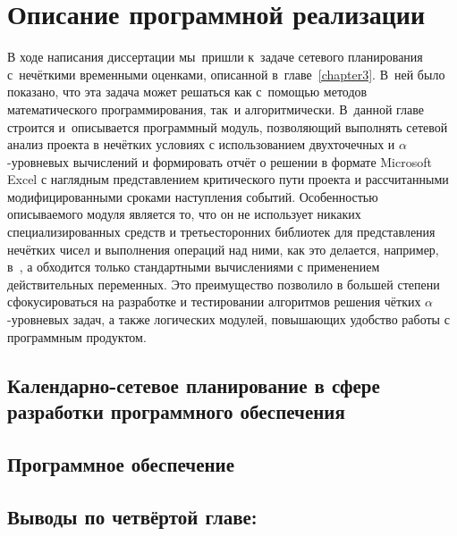 \chapter{Описание программной реализации}
\label{chapter4}

В ходе написания диссертации мы~пришли к~задаче сетевого планирования с~нечёткими временными оценками, описанной в~главе~\ref{chapter3}. В~ней было показано, что эта задача может решаться как с~помощью методов математического программирования, так~и алгоритмически. В~данной главе строится и~описывается программный модуль, позволяющий выполнять сетевой анализ проекта в нечётких условиях с использованием двухточечных и $\alpha$-уровневых вычислений и формировать отчёт о решении в формате Microsoft Excel с наглядным представлением критического пути проекта и рассчитанными модифицированными сроками наступления событий. Особенностью описываемого модуля является то, что он не использует никаких специализированных средств и третьесторонних библиотек для представления нечётких чисел и выполнения операций над ними, как это делается, например, в~\cite{Gallyamov, Kruglov_Balashov, Koroteev_Fuzzy_Arithmetics}, а обходится только стандартными вычислениями с применением действительных переменных. Это преимущество позволило в большей степени сфокусироваться на разработке и тестировании алгоритмов решения чётких $\alpha$-уровневых задач, а также логических модулей, повышающих удобство работы с программным продуктом.

\newpage
\section{Календарно-сетевое планирование в сфере разработки программного обеспечения} 
\label{chapter4_1}


\section{Программное обеспечение} 
\label{chapter4_2}


\newpage
\section*{Выводы по четвёртой главе:} 
\label{chapter4_3}
